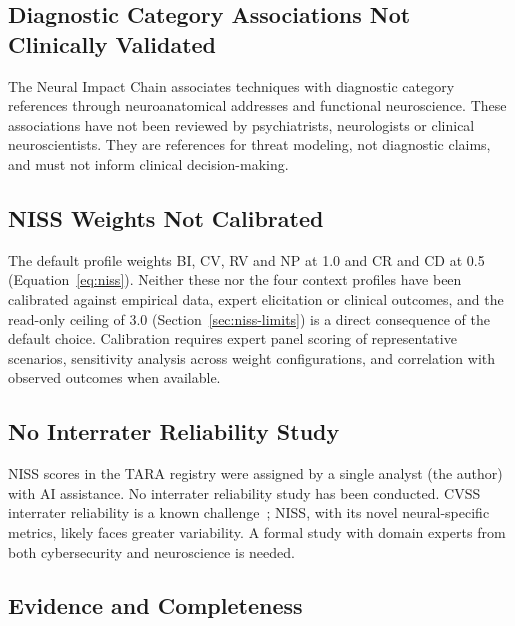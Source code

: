 \subsection{Diagnostic Category Associations Not Clinically Validated}

The Neural Impact Chain associates techniques with diagnostic category references through
neuroanatomical addresses and functional neuroscience. These associations have not been
reviewed by psychiatrists, neurologists or clinical neuroscientists. They are references for
threat modeling, not diagnostic claims, and must not inform clinical decision-making.

\subsection{NISS Weights Not Calibrated}

The default profile weights BI, CV, RV and NP at 1.0 and CR and CD at 0.5
(Equation~\ref{eq:niss}). Neither these nor the four context profiles have been calibrated
against empirical data, expert elicitation or clinical outcomes, and the read-only ceiling
of 3.0 (Section~\ref{sec:niss-limits}) is a direct consequence of the default choice.
Calibration requires expert panel scoring of representative scenarios, sensitivity analysis
across weight configurations, and correlation with observed outcomes when available.

\subsection{No Interrater Reliability Study}

NISS scores in the TARA registry were assigned by a single analyst (the author) with AI
assistance. No interrater reliability study has been conducted. CVSS interrater reliability
is a known challenge~\cite{first2023cvss4}; NISS, with its novel neural-specific metrics,
likely faces greater variability. A formal study with domain experts from both
cybersecurity and neuroscience is needed.

\subsection{Evidence and Completeness}

